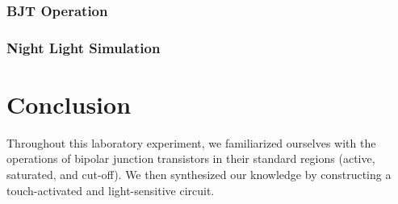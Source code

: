 \documentclass[
	letterpaper, %
	10pt, %
]{CSUniSchoolLabReport}
\begin{document}
\subsubsection{BJT Operation}

\subsubsection{Night Light Simulation}

\section{Conclusion}

Throughout this laboratory experiment, we familiarized ourselves with the operations of bipolar junction transistors in their standard regions (active, saturated, and cut-off). We then synthesized our knowledge by constructing a touch-activated and light-sensitive circuit.
\end{document}
